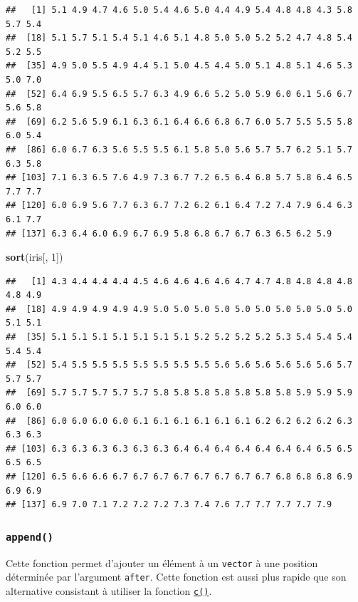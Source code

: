 \documentclass[]{book}
\newenvironment{Shaded}{\begin{snugshade}}{\end{snugshade}}
\newcommand{\DecValTok}[1]{\textcolor[rgb]{0.00,0.00,0.81}{#1}}
\newcommand{\KeywordTok}[1]{\textcolor[rgb]{0.13,0.29,0.53}{\textbf{#1}}}
\newcommand{\NormalTok}[1]{#1}
\begin{document}
\begin{verbatim}
##   [1] 5.1 4.9 4.7 4.6 5.0 5.4 4.6 5.0 4.4 4.9 5.4 4.8 4.8 4.3 5.8 5.7 5.4
##  [18] 5.1 5.7 5.1 5.4 5.1 4.6 5.1 4.8 5.0 5.0 5.2 5.2 4.7 4.8 5.4 5.2 5.5
##  [35] 4.9 5.0 5.5 4.9 4.4 5.1 5.0 4.5 4.4 5.0 5.1 4.8 5.1 4.6 5.3 5.0 7.0
##  [52] 6.4 6.9 5.5 6.5 5.7 6.3 4.9 6.6 5.2 5.0 5.9 6.0 6.1 5.6 6.7 5.6 5.8
##  [69] 6.2 5.6 5.9 6.1 6.3 6.1 6.4 6.6 6.8 6.7 6.0 5.7 5.5 5.5 5.8 6.0 5.4
##  [86] 6.0 6.7 6.3 5.6 5.5 5.5 6.1 5.8 5.0 5.6 5.7 5.7 6.2 5.1 5.7 6.3 5.8
## [103] 7.1 6.3 6.5 7.6 4.9 7.3 6.7 7.2 6.5 6.4 6.8 5.7 5.8 6.4 6.5 7.7 7.7
## [120] 6.0 6.9 5.6 7.7 6.3 6.7 7.2 6.2 6.1 6.4 7.2 7.4 7.9 6.4 6.3 6.1 7.7
## [137] 6.3 6.4 6.0 6.9 6.7 6.9 5.8 6.8 6.7 6.7 6.3 6.5 6.2 5.9
\end{verbatim}

\begin{Shaded}
\begin{Highlighting}[]
\KeywordTok{sort}\NormalTok{(iris[, }\DecValTok{1}\NormalTok{])}
\end{Highlighting}
\end{Shaded}

\begin{verbatim}
##   [1] 4.3 4.4 4.4 4.4 4.5 4.6 4.6 4.6 4.6 4.7 4.7 4.8 4.8 4.8 4.8 4.8 4.9
##  [18] 4.9 4.9 4.9 4.9 4.9 5.0 5.0 5.0 5.0 5.0 5.0 5.0 5.0 5.0 5.0 5.1 5.1
##  [35] 5.1 5.1 5.1 5.1 5.1 5.1 5.1 5.2 5.2 5.2 5.2 5.3 5.4 5.4 5.4 5.4 5.4
##  [52] 5.4 5.5 5.5 5.5 5.5 5.5 5.5 5.5 5.6 5.6 5.6 5.6 5.6 5.6 5.7 5.7 5.7
##  [69] 5.7 5.7 5.7 5.7 5.7 5.8 5.8 5.8 5.8 5.8 5.8 5.8 5.9 5.9 5.9 6.0 6.0
##  [86] 6.0 6.0 6.0 6.0 6.1 6.1 6.1 6.1 6.1 6.1 6.2 6.2 6.2 6.2 6.3 6.3 6.3
## [103] 6.3 6.3 6.3 6.3 6.3 6.3 6.4 6.4 6.4 6.4 6.4 6.4 6.4 6.5 6.5 6.5 6.5
## [120] 6.5 6.6 6.6 6.7 6.7 6.7 6.7 6.7 6.7 6.7 6.7 6.8 6.8 6.8 6.9 6.9 6.9
## [137] 6.9 7.0 7.1 7.2 7.2 7.2 7.3 7.4 7.6 7.7 7.7 7.7 7.7 7.9
\end{verbatim}

\hypertarget{l015append}{%
\subsubsection{\texorpdfstring{\texttt{append()}}{append()}}\label{l015append}}

Cette fonction permet d'ajouter un élément à un \texttt{vector} à une position déterminée par l'argument \texttt{after}. Cette fonction est aussi plus rapide que son alternative consistant à utiliser la fonction \protect\hyperlink{l014vector}{\texttt{c()}}.
\end{document}
